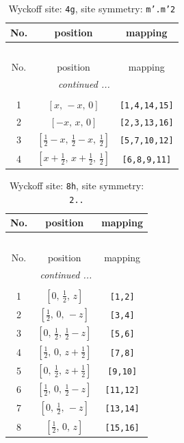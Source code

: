 \documentclass[fleqn,8pt]{jsarticle}
\begin{document}
\renewcommand{\arraystretch}{1.2}
\begin{longtable}{ccc}
\caption{Wyckoff site: {\tt 4g}, site symmetry: {\tt m'.m'2}}
 \\
 \hline \hline
No. & position & mapping \\ \hline \endfirsthead

\multicolumn{2}{l}{\tablename\ \thetable{}} \\
 \hline \hline
No. & position & mapping \\ \hline \endhead

 \hline \hline
\multicolumn{2}{r}{\footnotesize\it continued ...} \\ \endfoot

 \hline \hline
\multicolumn{2}{r}{} \\ \endlastfoot

1 & $\left[ x,\, - x,\, 0 \right]$ & {\tt [1,4,14,15]} \\ \hline
2 & $\left[ - x,\, x,\, 0 \right]$ & {\tt [2,3,13,16]} \\ \hline
3 & $\left[ \frac{1}{2} - x,\, \frac{1}{2} - x,\, \frac{1}{2} \right]$ & {\tt [5,7,10,12]} \\ \hline
4 & $\left[ x + \frac{1}{2},\, x + \frac{1}{2},\, \frac{1}{2} \right]$ & {\tt [6,8,9,11]} \\
\end{longtable}
\renewcommand{\arraystretch}{1.2}
\begin{longtable}{ccc}
\caption{Wyckoff site: {\tt 8h}, site symmetry: {\tt 2..}}
 \\
 \hline \hline
No. & position & mapping \\ \hline \endfirsthead

\multicolumn{2}{l}{\tablename\ \thetable{}} \\
 \hline \hline
No. & position & mapping \\ \hline \endhead

 \hline \hline
\multicolumn{2}{r}{\footnotesize\it continued ...} \\ \endfoot

 \hline \hline
\multicolumn{2}{r}{} \\ \endlastfoot

1 & $\left[ 0,\, \frac{1}{2},\, z \right]$ & {\tt [1,2]} \\ \hline
2 & $\left[ \frac{1}{2},\, 0,\, - z \right]$ & {\tt [3,4]} \\ \hline
3 & $\left[ 0,\, \frac{1}{2},\, \frac{1}{2} - z \right]$ & {\tt [5,6]} \\ \hline
4 & $\left[ \frac{1}{2},\, 0,\, z + \frac{1}{2} \right]$ & {\tt [7,8]} \\ \hline
5 & $\left[ 0,\, \frac{1}{2},\, z + \frac{1}{2} \right]$ & {\tt [9,10]} \\ \hline
6 & $\left[ \frac{1}{2},\, 0,\, \frac{1}{2} - z \right]$ & {\tt [11,12]} \\ \hline
7 & $\left[ 0,\, \frac{1}{2},\, - z \right]$ & {\tt [13,14]} \\ \hline
8 & $\left[ \frac{1}{2},\, 0,\, z \right]$ & {\tt [15,16]} \\
\end{longtable}
\end{document}

